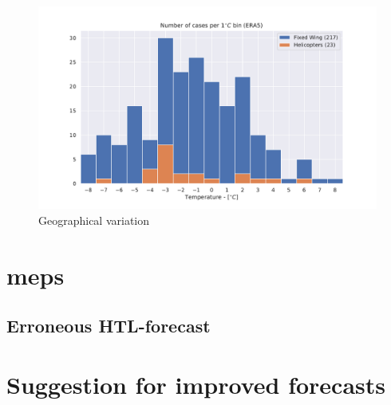 \begin{figure}
    \centering
    \includegraphics[width=\textwidth]{Figures/temperature.pdf}
    \caption{Geographical variation}
    \label{fig:hti}
\end{figure}



\section{\acrfull{meps}}

\subsection{Erroneous HTL-forecast}


\section{Suggestion for improved forecasts}

